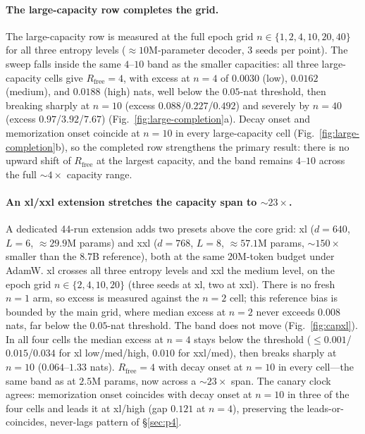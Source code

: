 \documentclass[11pt]{article}
\begin{document}
\paragraph{The large-capacity row completes the grid.}\label{sec:largecompletion}
The large-capacity row is measured at the
full epoch grid $n\in\{1,2,4,10,20,40\}$ for all three entropy levels
(${\approx}10$M-parameter decoder, 3 seeds per point). The sweep
falls inside the same $4$--$10$ band as the smaller capacities:
all three large-capacity cells give $R_{\mathrm{free}}=4$, with excess at $n=4$ of
$0.0030$ (low), $0.0162$ (medium), and $0.0188$ (high) nats, well below the $0.05$-nat
threshold, then breaking sharply at $n=10$ (excess $0.088$/$0.227$/$0.492$) and severely by
$n=40$ (excess $0.97$/$3.92$/$7.67$) (Fig.~\ref{fig:large-completion}a).
Decay onset and memorization onset coincide at $n=10$ in every large-capacity cell
(Fig.~\ref{fig:large-completion}b), so the completed row strengthens the primary result: there is no upward shift of $R_{\mathrm{free}}$ at the largest
capacity, and the band remains $4$--$10$ across the full ${\sim}4\times$ capacity range.

\paragraph{An xl/xxl extension stretches the capacity span to ${\sim}23\times$.}\label{sec:capxl}
A dedicated 44-run extension adds two presets above the core grid: xl ($d{=}640$,
$L{=}6$, ${\approx}29.9$M params) and xxl ($d{=}768$, $L{=}8$, ${\approx}57.1$M params,
${\sim}150\times$ smaller than the $8.7$B reference), both at the same 20M-token
budget under AdamW. xl crosses all three entropy levels and xxl the medium level, on
the epoch grid $n\in\{2,4,10,20\}$ (three seeds at xl, two at xxl). There is no
fresh $n{=}1$ arm, so excess is measured against the $n{=}2$ cell; this reference
bias is bounded by the main grid, where median excess at $n{=}2$ never exceeds
$0.008$ nats, far below the $0.05$-nat threshold. The band does not move (Fig.~\ref{fig:capxl}). In all four cells the median excess
at $n{=}4$ stays below the threshold (${\leq}0.001$/$0.015$/$0.034$ for xl
low/med/high, $0.010$ for xxl/med), then breaks sharply at $n{=}10$
($0.064$--$1.33$ nats). $R_{\mathrm{free}}=4$ with decay onset at $n{=}10$ in every
cell---the same band as at $2.5$M params, now across a ${\sim}23\times$ span. The canary clock agrees:
memorization onset coincides with decay onset at $n{=}10$ in three of the four cells
and leads it at xl/high (gap $0.121$ at $n{=}4$), preserving the leads-or-coincides,
never-lags pattern of \S\ref{sec:p4}.
\end{document}
